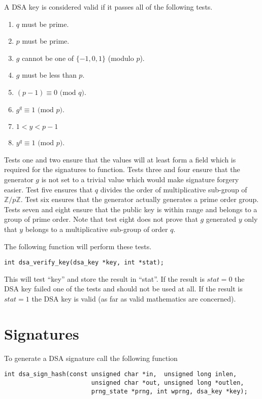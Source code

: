 \documentclass[a4paper]{book}
\def\Z{{\mathbb Z}}
\begin{document}
A DSA key is considered valid if it passes all of the following tests.

\begin{enumerate}
   \item $q$ must be prime.
   \item $p$ must be prime.
   \item $g$ cannot be one of $\lbrace -1, 0, 1 \rbrace$ (modulo $p$).
   \item $g$ must be less than $p$.
   \item $(p-1) \equiv 0 \mbox{ (mod }q\mbox{)}$.
   \item $g^q \equiv 1 \mbox{ (mod }p\mbox{)}$.
   \item $1 < y < p - 1$
   \item $y^q \equiv 1 \mbox{ (mod }p\mbox{)}$.
\end{enumerate}

Tests one and two ensure that the values will at least form a field which is required for the signatures to  
function.  Tests three and four ensure that the generator $g$ is not set to a trivial value which would make signature
forgery easier.  Test five ensures that $q$ divides the order of multiplicative sub-group of $\Z/p\Z$. Test six
ensures that the generator actually generates a prime order group.  Tests seven and eight ensure that the public key
is within range and belongs to a group of prime order.  Note that test eight does not prove that $g$ generated $y$ only
that $y$ belongs to a multiplicative sub-group of order $q$. 

The following function will perform these tests.

\begin{verbatim}
int dsa_verify_key(dsa_key *key, int *stat);
\end{verbatim}

This will test ``key'' and store the result in ``stat''.  If the result is $stat = 0$ the DSA key failed one of the tests
and should not be used at all.  If the result is $stat = 1$ the DSA key is valid (as far as valid mathematics are concerned).

\section{Signatures}
To generate a DSA signature call the following function

\begin{verbatim}
int dsa_sign_hash(const unsigned char *in,  unsigned long inlen,
                        unsigned char *out, unsigned long *outlen,
                        prng_state *prng, int wprng, dsa_key *key);
\end{verbatim}
\end{document}
